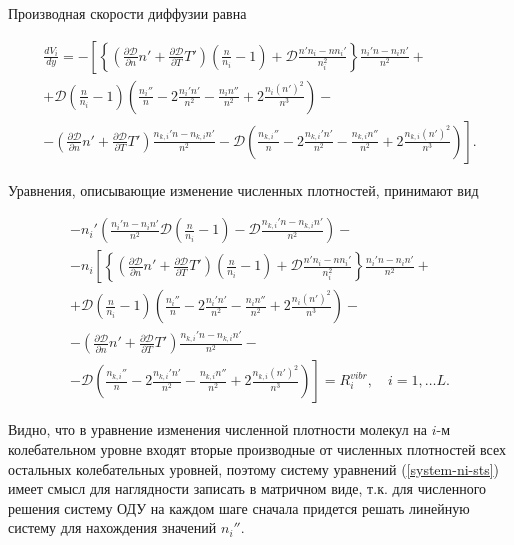 \documentclass[12pt]{article}
\begin{document}
Производная скорости диффузии равна

\begin{multline}
  \frac{dV_{i}}{dy} = -\left[\left\{\left(\frac{\partial \mathcal{D}}{\partial n}n' + \frac{\partial \mathcal{D}}{\partial T}T' \right)\left(\frac{n}{n_{i}} - 1 \right) 
  + \mathcal{D} \frac{n'n_{i} - n n_{i}'}{n_{i}^2} \right\} \frac{n_{i}'n - n_{i}n'}{n^2} \right. + \\
  + \mathcal{D} \left(\frac{n}{n_{i}} - 1\right) \left(\frac{n_{i}''}{n} - 2\frac{n_{i}'n'}{n^2} - \frac{n_{i}n''}{n^2} + 2\frac{n_{i}\left(n' \right)^2}{n^3} \right) - \\
  - \left(\frac{\partial \mathcal{D}}{\partial n}n' + \frac{\partial \mathcal{D}}{\partial T}T' \right) \frac{n_{k,i}'n - n_{k,i}n'}{n^2} 
  - \left.\mathcal{D} \left(\frac{n_{k,i}''}{n} - 2\frac{n_{k,i}'n'}{n^2} - \frac{n_{k,i} n''}{n^2} + 2\frac{n_{k,i}\left(n' \right)^2}{n^3} \right) \right].
\end{multline}

Уравнения, описывающие изменение численных плотностей, принимают вид

\begin{multline}
  -n_{i}' \left(\frac{n_{i}'n - n_{i}n'}{n^2} \mathcal{D} \left(\frac{n}{n_{i}} - 1 \right) - \mathcal{D} \frac{n_{k,i}'n - n_{k,i}n'}{n^2}\right) - \\  %
  - n_{i} \left[\left\{\left(\frac{\partial \mathcal{D}}{\partial n}n' + \frac{\partial \mathcal{D}}{\partial T}T' \right)\left(\frac{n}{n_{i}} - 1 \right) 
  + \mathcal{D} \frac{n'n_{i} - n n_{i}'}{n_{i}^2} \right\} \frac{n_{i}'n - n_{i}n'}{n^2} \right. + \\
  + \mathcal{D} \left(\frac{n}{n_{i}} - 1\right) \left(\frac{n_{i}''}{n} - 2\frac{n_{i}'n'}{n^2} - \frac{n_{i}n''}{n^2} + 2\frac{n_{i}\left(n' \right)^2}{n^3} \right) - \\
  - \left(\frac{\partial \mathcal{D}}{\partial n}n' + \frac{\partial \mathcal{D}}{\partial T}T' \right) \frac{n_{k,i}'n - n_{k,i}n'}{n^2} - \\
  - \left.\mathcal{D} \left(\frac{n_{k,i}''}{n} - 2\frac{n_{k,i}'n'}{n^2} - \frac{n_{k,i} n''}{n^2} + 2\frac{n_{k,i}\left(n' \right)^2}{n^3} \right) \right]
  = R_{i}^{vibr},\quad i=1,\ldots L. \label{system-ni-sts}
\end{multline}

Видно, что в уравнение изменения численной плотности молекул на $i$-м колебательном уровне входят вторые производные от численных плотностей всех остальных колебательных уровней, поэтому систему уравнений (\ref{system-ni-sts}) имеет смысл для наглядности записать в матричном виде, т.к. для численного решения систему ОДУ на каждом шаге сначала придется решать линейную систему для нахождения значений $n_{i}''$.
\end{document}
